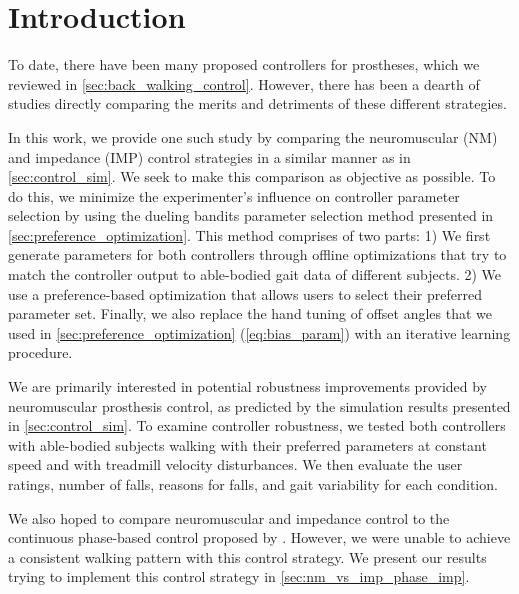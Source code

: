 \section{Introduction}

To date, there have been many proposed controllers for prostheses, which we
reviewed in \cref{sec:back_walking_control}. However, there has been a dearth of
studies directly comparing the merits and detriments of these different
strategies. 

In this work, we provide one such study by comparing the neuromuscular (NM) and
impedance (IMP) control strategies in a similar manner as in
\cref{sec:control_sim}.  We seek to make this comparison as objective as
possible. To do this, we minimize the experimenter's influence on controller
parameter selection by using the dueling bandits parameter selection method
presented in \cref{sec:preference_optimization}. This method comprises of two
parts: 1) We first generate parameters for both controllers through offline
optimizations that try to match the controller output to able-bodied gait data
of different subjects. 2) We use a preference-based optimization that allows
users to select their preferred parameter set. Finally, we also replace the hand
tuning of offset angles that we used in \cref{sec:preference_optimization}
(\cref{eq:bias_param}) with an iterative learning procedure.

We are primarily interested in potential robustness improvements provided by
neuromuscular prosthesis control, as predicted by the simulation results
presented in \cref{sec:control_sim}. To examine controller robustness, we tested
both controllers with able-bodied subjects walking with their preferred
parameters at constant speed and with treadmill velocity disturbances. We then
evaluate the user ratings, number of falls, reasons for falls, and gait
variability for each condition. 

We also hoped to compare neuromuscular and impedance control to the continuous
phase-based control proposed by \citet{quintero2016preliminary}. However, we
were unable to achieve a consistent walking pattern with this control strategy.
We present our results trying to implement this control strategy in
\cref{sec:nm_vs_imp_phase_imp}.
